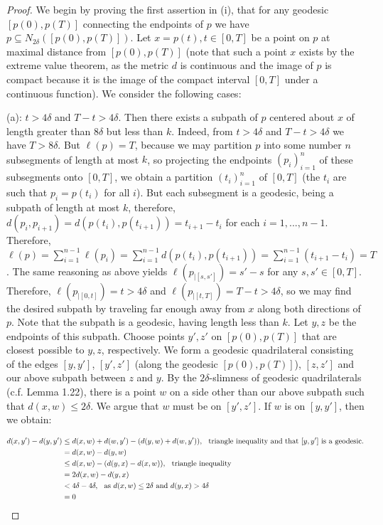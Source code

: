 \documentclass[12pt]{article}
\newcommand{\vs}{\vskip10pt}
\begin{document}
	
	\begin{proof}
		
		We begin by proving the first assertion in (i), that for any geodesic $[p(0), p(T)]$ connecting the endpoints of $p$ we have $p \subseteq N_{2 \delta}([p(0), p(T)])$. Let $x = p(t), t \in [0, T]$ be a point on $p$ at maximal distance from $[p(0), p(T)]$ (note that such a point $x$ exists by the extreme value theorem, as the metric $d$ is continuous and the image of $p$ is compact because it is the image of the compact interval $[0,T]$ under a continuous function). We consider the following cases: 
		
		\vs 
		
		(a): $t > 4 \delta$ and $T - t > 4 \delta$. Then there exists a subpath of $p$ centered about $x$ of length greater than $8 \delta$ but less than $k$. Indeed, from $t > 4 \delta$ and $T - t > 4 \delta$ we have $T > 8 \delta$. But $\ell(p) = T$, because we may partition $p$ into some number $n$ subsegments of length at most $k$, so projecting the endpoints $(p_i)_{i=1}^n$ of these subsegments onto $[0,T]$, we obtain a partition $(t_i)_{i=1}^n$ of $[0,T]$ (the $t_i$ are such that $p_i = p(t_i)$ for all $i$). But each subsegment is a geodesic, being a subpath of length at most $k$, therefore, $d(p_i, p_{i+1}) = d(p(t_i), p(t_{i+1})) = t_{i+1} - t_i$ for each $i  = 1,...,n-1$. Therefore, $\ell(p) = \sum_{i = 1}^{n-1} \ell(p_i) = \sum_{i = 1}^{n-1} d(p(t_i), p(t_{i+1})) = \sum_{i = 1}^{n-1} (t_{i+1} - t_i) = T$. The same reasoning as above yields $\ell(p_{\vert [s, s']}) = s' - s$ for any $s,s' \in [0,T]$. Therefore, $\ell(p_{\vert [0, t]}) = t > 4 \delta$ and $\ell(p_{\vert [t, T]}) = T - t > 4 \delta$, so we may find the desired subpath by traveling far enough away from $x$ along both directions of $p$. Note that the subpath is a geodesic, having length less than $k$. Let $y, z$ be the endpoints of this subpath. Choose points $y', z'$ on $[p(0), p(T)]$ that are closest possible to $y,z$, respectively. We form a geodesic quadrilateral consisting of the edges $[y, y']$, $[y', z']$ (along the geodesic $[p(0), p(T)]$), $[z,z']$ and our above subpath between $z$ and $y$. By the $2 \delta$-slimness of geodesic quadrilaterals (c.f. Lemma 1.22), there is a point $w$ on a side other than our above subpath such that $d(x, w) \leq 2 \delta$. We argue that $w$ must be on $[y', z']$. If $w$ is on $[y, y']$, then we obtain: 
		
		\begin{align*}
		d(x, y') - d(y, y') &\leq d(x,w) + d(w,y') - (d(y, w) + d(w, y')), \hspace{0.25cm} \text{triangle inequality and that } [y,y'] \text{ is a geodesic}. \\
		&= d(x,w) - d(y, w) \\
		&\leq d(x,w) - (d(y,x) - d(x,w)), \hspace{0.25cm} \text{triangle inequality} \\
		&= 2d(x,w) - d(y,x) \\
		&< 4 \delta - 4 \delta, \hspace{0.25cm} \text{as } d(x,w) \leq 2\delta \text{ and } d(y,x) > 4 \delta \\
		&= 0
		\end{align*} 
		

\end{proof}
\end{document}
